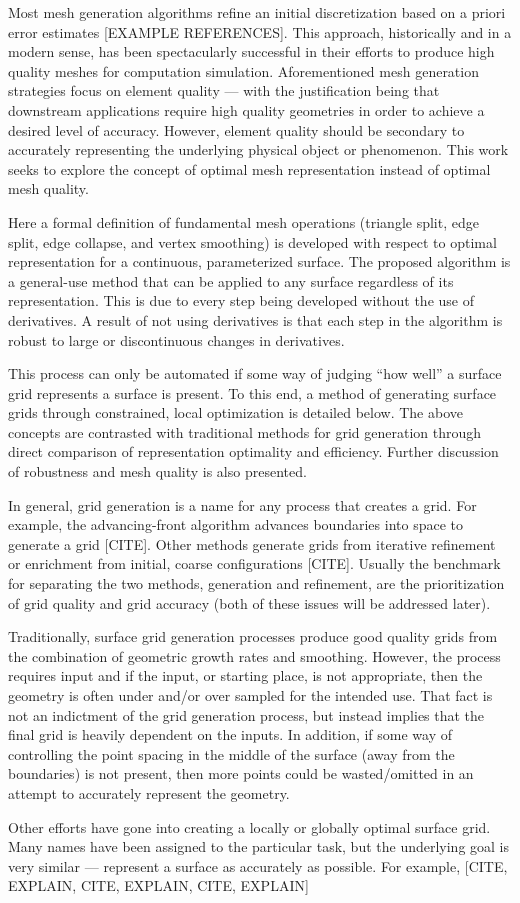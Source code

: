 Most mesh generation algorithms refine an initial discretization based on
a priori error estimates [EXAMPLE REFERENCES]. This approach,
historically and in a modern sense, has been spectacularly successful in
their efforts to produce high quality meshes for computation simulation.
Aforementioned mesh generation strategies focus on element quality ---
with the justification being that downstream applications require high
quality geometries in order to achieve a desired level of accuracy.
However, element quality should be secondary to accurately representing
the underlying physical object or phenomenon.  This work seeks to
explore the concept of optimal mesh representation instead of optimal
mesh quality.

Here a formal definition of fundamental mesh operations (triangle split,
edge split, edge collapse, and vertex smoothing) is developed with
respect to optimal representation for a continuous, parameterized
surface. The proposed algorithm is a general-use method that can be
applied to any surface regardless of its representation. This is due to
every step being developed without the use of derivatives. A result of
not using derivatives is that each step in the algorithm is robust to
large or discontinuous changes in derivatives.

This process can only be automated if some way of judging ``how well'' a
surface grid represents a surface is present. To this end, a method of
generating surface grids through constrained, local optimization is
detailed below. The above concepts are contrasted with traditional
methods for grid generation through direct comparison of representation
optimality and efficiency. Further discussion of robustness and mesh
quality is also presented.

In general, grid generation is a name for any process that creates a
grid. For example, the advancing-front algorithm advances boundaries
into space to generate a grid \cite{tristrano98, diaz-morcillo98}[CITE].
Other methods generate grids from iterative refinement or enrichment
from initial, coarse configurations \cite{marcum98, marcum00,
shewchuk02}[CITE]. Usually the benchmark for separating the two
methods, generation and refinement, are the prioritization of grid
quality and grid accuracy (both of these issues will be addressed
later).

Traditionally, surface grid generation processes produce good quality
grids from the combination of geometric growth rates and smoothing.
However, the process requires input and if the input, or starting place,
is not appropriate, then the geometry is often under and/or over sampled
for the intended use. That fact is not an indictment of the grid
generation process, but instead implies that the final grid is heavily
dependent on the inputs. In addition, if some way of controlling the
point spacing in the middle of the surface (away from the boundaries) is
not present, then more points could be wasted/omitted in an attempt to
accurately represent the geometry.

Other efforts have gone into creating a locally or globally optimal
surface grid. Many names have been assigned to the particular task, but
the underlying goal is very similar --- represent a surface as
accurately as possible. For example, [CITE, EXPLAIN, CITE, EXPLAIN,
CITE, EXPLAIN]
